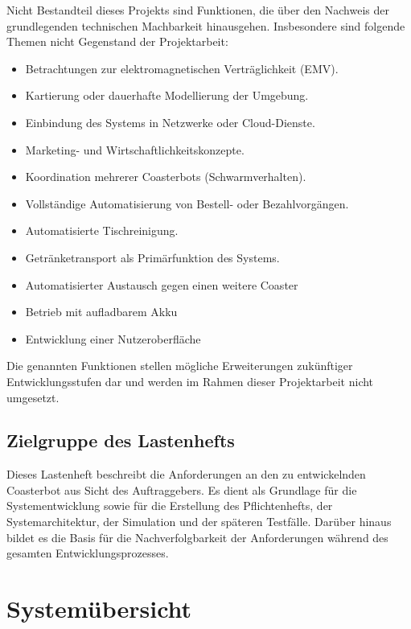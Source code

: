 \documentclass[
  a4paper,
  12pt,
  DIV=12,        %
  parskip=half,  %
  headings=small %
]{scrartcl}
\theoremstyle{definition}
\providecommand{\tightlist}{%
  \setlength{\itemsep}{0pt}\setlength{\parskip}{0pt}}
\theoremstyle{definition}
\begin{document}
Nicht Bestandteil dieses Projekts sind Funktionen, die über den Nachweis
der grundlegenden technischen Machbarkeit hinausgehen. Insbesondere sind
folgende Themen nicht Gegenstand der Projektarbeit:

\begin{itemize}
\tightlist
\item
  Betrachtungen zur elektromagnetischen Verträglichkeit (EMV).
\item
  Kartierung oder dauerhafte Modellierung der Umgebung.
\item
  Einbindung des Systems in Netzwerke oder Cloud-Dienste.
\item
  Marketing- und Wirtschaftlichkeitskonzepte.
\item
  Koordination mehrerer Coasterbots (Schwarmverhalten).
\item
  Vollständige Automatisierung von Bestell- oder Bezahlvorgängen.
\item
  Automatisierte Tischreinigung.
\item
  Getränketransport als Primärfunktion des Systems.
\item
  Automatisierter Austausch gegen einen weitere Coaster
\item
  Betrieb mit aufladbarem Akku
\item
  Entwicklung einer Nutzeroberfläche
\end{itemize}

Die genannten Funktionen stellen mögliche Erweiterungen zukünftiger
Entwicklungsstufen dar und werden im Rahmen dieser Projektarbeit nicht
umgesetzt.

\subsection{Zielgruppe des
Lastenhefts}\label{zielgruppe-des-lastenhefts}

Dieses Lastenheft beschreibt die Anforderungen an den zu entwickelnden
Coasterbot aus Sicht des Auftraggebers. Es dient als Grundlage für die
Systementwicklung sowie für die Erstellung des Pflichtenhefts, der
Systemarchitektur, der Simulation und der späteren Testfälle. Darüber
hinaus bildet es die Basis für die Nachverfolgbarkeit der Anforderungen
während des gesamten Entwicklungsprozesses.

\section{Systemübersicht}\label{systemuxfcbersicht}
\end{document}

